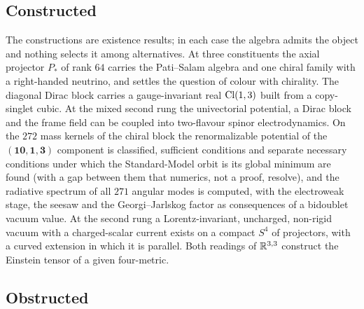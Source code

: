 \subsection{Constructed}

The constructions are existence results; in each case the algebra admits the object and nothing selects it among alternatives. At three constituents the axial projector
$P_*$ of rank $64$ carries the Pati--Salam algebra and one chiral family with a right-handed neutrino, and settles the question of colour with chirality. The diagonal Dirac
block carries a gauge-invariant real $\mathrm{Cl}(1,3)$ built from a copy-singlet cubic. At the mixed second rung the univectorial potential, a Dirac block and the frame field can
be coupled into two-flavour spinor electrodynamics. On the $272$ mass kernels of the chiral block the renormalizable potential of the $(\mathbf{10},\mathbf1,\mathbf3)$ component
is classified, sufficient conditions and separate necessary conditions under which the Standard-Model orbit is its global minimum are found (with a gap between them
that numerics, not a proof, resolve), and the radiative spectrum of all $271$ angular modes is computed, with
the electroweak stage, the seesaw and the Georgi--Jarlskog factor as consequences of a bidoublet vacuum value. At the second rung a Lorentz-invariant, uncharged, non-rigid
vacuum with a charged-scalar current exists on a compact $S^4$ of projectors, with a curved extension in which it is parallel. Both readings of $\mathbb{R}^{3,3}$ construct the
Einstein tensor of a given four-metric.

\subsection{Obstructed}

